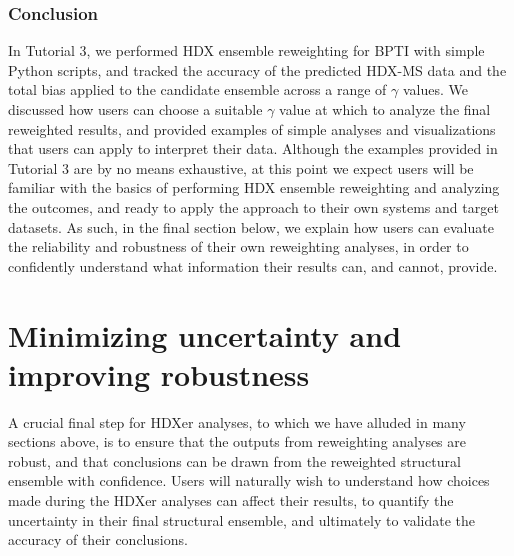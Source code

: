 \documentclass[9pt,tutorial]{livecoms}
\begin{document}
\subsubsection{Conclusion}

In Tutorial 3, we performed HDX ensemble reweighting for BPTI with simple Python scripts, and tracked the accuracy of the predicted HDX-MS data and the total bias applied to the candidate ensemble across a range of $\gamma$ values.
We discussed how users can choose a suitable $\gamma$ value at which to analyze the final reweighted results, and provided examples of simple analyses and visualizations that users can apply to interpret their data.
Although the examples provided in Tutorial 3 are by no means exhaustive, at this point we expect users will be familiar with the basics of performing HDX ensemble reweighting and analyzing the outcomes, and ready to apply the approach to their own systems and target datasets.
As such, in the final section below, we explain how users can evaluate the reliability and robustness of their own reweighting analyses, in order to confidently understand what information their results can, and cannot, provide.

\section{Minimizing uncertainty and improving robustness}\label{robustness_sect}

A crucial final step for HDXer analyses, to which we have alluded in many sections above, is to ensure that the outputs from reweighting analyses are robust, and that conclusions can be drawn from the reweighted structural ensemble with confidence.
Users will naturally wish to understand how choices made during the HDXer analyses can affect their results, to quantify the uncertainty in their final structural ensemble, and ultimately to validate the accuracy of their conclusions.
\end{document}
